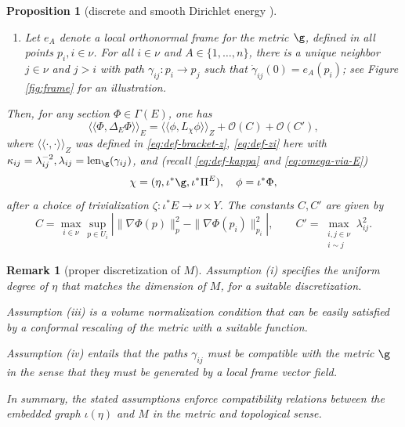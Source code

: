 \documentclass[10pt,reqno]{amsart}
\numberwithin{equation}{section}
\theoremstyle{bfnote}
\newtheorem{proposition}[theorem]{Proposition}
\theoremstyle{bfdef}
\newtheorem{remark}[theorem]{Remark}
\newcommand{\mc}[1]{\mathcal{#1}}
\newcommand{\lla}{\langle\langle}
\newcommand{\rra}{\rangle\rangle}
\newcommand{\n}[1]{\|#1\|}
\renewcommand\o\operatorname
\providecommand\hgen; %
\renewcommand{\hgen}{L}
\begin{document}
\begin{proposition}[discrete and smooth Dirichlet energy \cite{Gattringer:2010zz}]
\begin{enumerate}
			\item Let $e_A$ denote a local orthonormal frame for the metric $\g$, defined in all points $p_i, i \in \nu$. For all $i \in \nu$ and $A \in \{1,\dots,n\}$, there is a unique neighbor $j \in \nu$ and $j > i$ with path $\gamma_{ij} : p_i \to p_j$ such that $\dot \gamma_{ij}(0) = e_A(p_i)$; see Figure \ref{fig:frame} for an illustration.
		\end{enumerate}
		Then, for any section $\Phi \in \Gamma(E)$, one has
		\begin{equation}
		    \lla \Phi, \Delta_{E} \Phi \rra_{E} = \lla \phi, \hgen_{\chi} \phi \rra_Z + \mc{O}(C) + \mc{O}(C'),
		\end{equation}
		where $\lla \cdot,\cdot \rra_Z$ was defined in \eqref{eq:def-bracket-z}, \eqref{eq:def-zi} here with $\kappa_{ij}=\lambda_{ij}^{-2}, \lambda_{ij} = \o{len}_{\g}(\gamma_{ij})$, and (recall \eqref{eq:def-kappa} and \eqref{eq:omega-via-E})
		\begin{equation}
			\chi = (\eta,\iota^{*}\g,\iota^{*}\Pi^{E}), \quad \phi = \iota^{*} \Phi,
		\end{equation}
		after a choice of trivialization $\zeta: \iota^*E \to \nu \times Y$. The constants $C,C'$ are given by
		\begin{equation}
			C = \max_{i \in \nu} \sup_{p \in U_i} \left| \n{\nabla \Phi(p)}_{p}^2 - \n{\nabla \Phi(p_i)}_{p_{i}}^2 \right|, \qquad 
			C' = \max_{\substack{i,j \in \nu \\ i \sim j}} \lambda_{ij}^{2}.
		\end{equation}
	\end{proposition}

	\begin{remark}[proper discretization of $M$]
		Assumption (i) specifies the uniform degree of $\eta$ that matches the dimension of $M$, for a suitable discretization.


		Assumption (iii) is a volume normalization condition that can be easily satisfied by a conformal rescaling of the metric with a suitable function.

		Assumption (iv) entails that the paths $\gamma_{ij}$ must be compatible with the metric $\g$ in the sense that they must be generated by a local frame vector field.

		In summary, the stated assumptions enforce compatibility relations between the embedded graph $\iota(\eta)$ and $M$ in the metric and topological sense.
	\end{remark}
\end{document}
